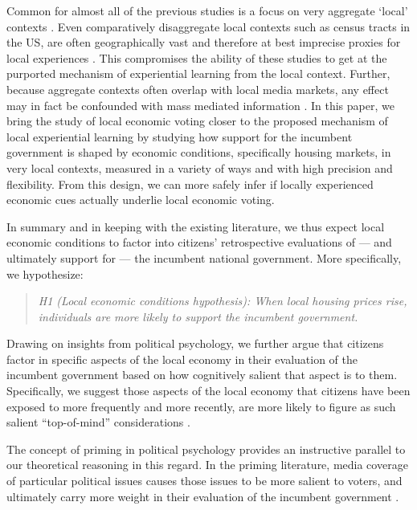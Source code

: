 \documentclass[12pt,a4paper]{article}
\begin{document}
	
	Common for almost all of the previous studies is a focus on very aggregate `local’ contexts \citep[for an exception see][]{bisgaard2016reconsidering,healy2017presidential}. Even comparatively disaggregate local contexts such as census tracts in the US, are often geographically vast and therefore at best imprecise proxies for local experiences \citep{dinesen2015ethnic,moore2017learning}. This compromises the ability of these studies to get at the purported mechanism of experiential learning from the local context. Further, because aggregate contexts often overlap with local media markets, any effect may in fact be confounded with mass mediated information \citep{books1999contextual,reeves2012ecologies}. In this paper, we bring the study of local economic voting closer to the proposed mechanism of local experiential learning by studying how support for the incumbent government is shaped by economic conditions, specifically housing markets, in very local contexts, measured in a variety of ways and with high precision and flexibility. From this design, we can more safely infer if locally experienced economic cues actually underlie local economic voting.
	
	In summary and in keeping with the existing literature, we thus expect local economic conditions to factor into citizens’ retrospective evaluations of — and ultimately support for — the incumbent national government. More specifically, we hypothesize:
	
	\newcommand{\hone}{the local economic conditions hypothesis}
	
	\begin{quote}
		
		\textit{H1 (Local economic conditions hypothesis): When local housing prices rise, individuals are more likely to support the incumbent government.}
		
	\end{quote}
	
	Drawing on insights from political psychology, we further argue that citizens factor in specific aspects of the local economy in their evaluation of the incumbent government based	on how cognitively salient that aspect is to them. Specifically, we suggest those aspects of the local economy that citizens have been exposed to more frequently and more recently, are more likely to figure as such salient “top-of-mind” considerations \citep{zaller1992nature}. 
	
	The concept of priming in political psychology provides an instructive parallel to our theoretical reasoning in this regard. In the priming literature, media coverage of particular political issues causes those issues to be more salient to voters, and ultimately carry more weight in their evaluation of the incumbent government \citep{iyengar1982experimental,iyengar1987news,krosnick1990altering}. 
	
\end{document}
